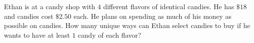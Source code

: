 Ethan is at a candy shop with $4$ different flavors of identical candies. He has $\$18$ and candies cost $\$2.50$ each. He plans on spending as much of his money as possible on candies. How many unique ways can Ethan select candies to buy if he wants to have at least $1$ candy of each flavor?
